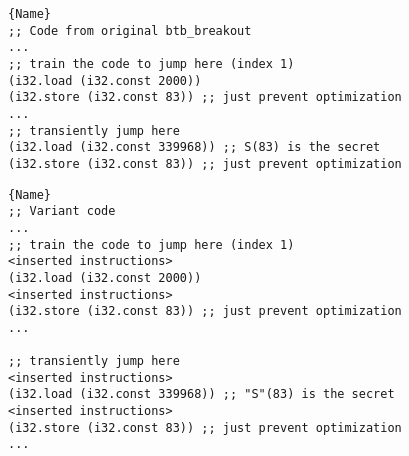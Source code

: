 


   \begin{minipage}[b]{\linewidth}
    \lstset{
        language=WAT,
                        style=watcode,
        basicstyle=\footnotesize\ttfamily,
                        columns=fullflexible,
                        breaklines=true}
        
        \begin{lstlisting}[label=example:padding,caption={Two jump locations in btb\_breakout. The top one trains the branch predictor, the bottom one is the expected jump that exfiltrates the memory access.},frame=b, captionpos=b]{Name}
;; Code from original btb_breakout
...
;; train the code to jump here (index 1)
(i32.load (i32.const 2000))
(i32.store (i32.const 83)) ;; just prevent optimization
...
;; transiently jump here
(i32.load (i32.const 339968)) ;; S(83) is the secret
(i32.store (i32.const 83)) ;; just prevent optimization
        \end{lstlisting}
\end{minipage}


\begin{minipage}[b]{\linewidth}
    \lstset{
        language=WAT,
                        style=watcode,
        basicstyle=\footnotesize\ttfamily,
                        columns=fullflexible,
                        breaklines=true}
        
        \begin{lstlisting}[label=example:padding2,caption={Variant of btb\_breakout with more instructions added indindinctly between jump places.},frame=b, captionpos=b]{Name}
;; Variant code
...
;; train the code to jump here (index 1)
<inserted instructions>
(i32.load (i32.const 2000))
<inserted instructions>
(i32.store (i32.const 83)) ;; just prevent optimization
...

;; transiently jump here
<inserted instructions>
(i32.load (i32.const 339968)) ;; "S"(83) is the secret
<inserted instructions>
(i32.store (i32.const 83)) ;; just prevent optimization
...
        \end{lstlisting}
\end{minipage}
